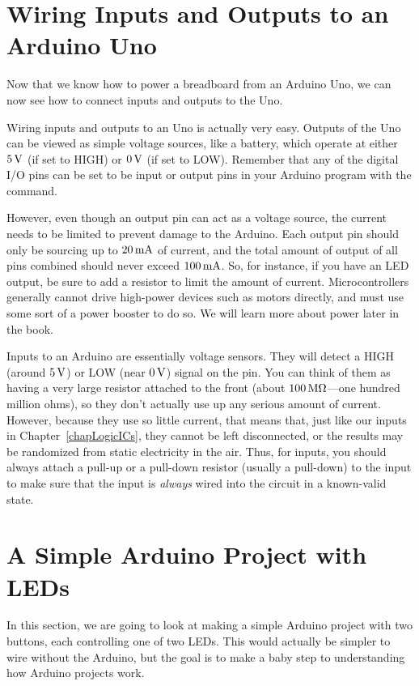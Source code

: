 \section{Wiring Inputs and Outputs to an Arduino Uno}

Now that we know how to power a breadboard from an Arduino Uno, we can now see how to connect inputs and outputs to the Uno.

Wiring inputs and outputs to an Uno is actually very easy.
Outputs of the Uno can be viewed as simple voltage sources, like a battery, which operate at either $5\,\si{\volt}$ (if set to HIGH) or $0\,\si{\volt}$ (if set to LOW).
Remember that any of the digital I/O pins can be set to be input or output pins in your Arduino program with the  command.

However, even though an output pin can act as a voltage source, the current needs to be limited to prevent damage to the Arduino.  
Each output pin should only be sourcing up to $20\,\si{\milli\ampere}$ of current, and the total amount of output of all pins combined should never exceed $100\,\si{\milli\ampere}$.
So, for instance, if you have an LED output, be sure to add a resistor to limit the amount of current.
Microcontrollers generally cannot drive high-power devices such as motors directly, and must use some sort of a power booster to do so.
We will learn more about power later in the book.

Inputs to an Arduino are essentially voltage sensors.
They will detect a HIGH (around $5\,\si{\volt}$) or LOW (near $0\,\si{\volt}$) signal on the pin.
You can think of them as having a very large resistor attached to the front (about $100\,\si{\mega\ohm}$---one hundred million ohms), so they don't actually use up any serious amount of current.
However, because they use so little current, that means that, just like our inputs in Chapter~\ref{chapLogicICs}, they cannot be left disconnected, or the results may be randomized from static electricity in the air.
Thus, for inputs, you should always attach a pull-up or a pull-down resistor (usually a pull-down) to the input to make sure that the input is \emph{always} wired into the circuit in a known-valid state.

\section{A Simple Arduino Project with LEDs}

In this section, we are going to look at making a simple Arduino project with two buttons, each controlling one of two LEDs.
This would actually be simpler to wire without the Arduino, but the goal is to make a baby step to understanding how Arduino projects work.

